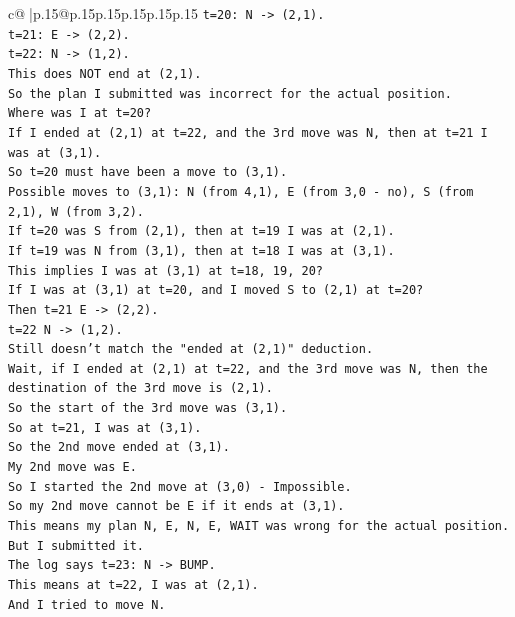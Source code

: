 \documentclass{article}
\begin{document}
{\begin{supertabular}{c@{$\;$}|p{.15\linewidth}@{}p{.15\linewidth}p{.15\linewidth}p{.15\linewidth}p{.15\linewidth}p{.15\linewidth}}
{{{\texttt{t=20: N {-}> (2,1).} \\
\texttt{t=21: E {-}> (2,2).} \\
\texttt{t=22: N {-}> (1,2).} \\
\texttt{This does NOT end at (2,1).} \\
\texttt{So the plan I submitted was incorrect for the actual position.} \\
\texttt{Where was I at t=20?} \\
\texttt{If I ended at (2,1) at t=22, and the 3rd move was N, then at t=21 I was at (3,1).} \\
\texttt{So t=20 must have been a move to (3,1).} \\
\texttt{Possible moves to (3,1): N (from 4,1), E (from 3,0 {-} no), S (from 2,1), W (from 3,2).} \\
\texttt{If t=20 was S from (2,1), then at t=19 I was at (2,1).} \\
\texttt{If t=19 was N from (3,1), then at t=18 I was at (3,1).} \\
\texttt{This implies I was at (3,1) at t=18, 19, 20?} \\
\texttt{If I was at (3,1) at t=20, and I moved S to (2,1) at t=20?} \\
\texttt{Then t=21 E {-}> (2,2).} \\
\texttt{t=22 N {-}> (1,2).} \\
\texttt{Still doesn't match the "ended at (2,1)" deduction.} \\
\texttt{Wait, if I ended at (2,1) at t=22, and the 3rd move was N, then the destination of the 3rd move is (2,1).} \\
\texttt{So the start of the 3rd move was (3,1).} \\
\texttt{So at t=21, I was at (3,1).} \\
\texttt{So the 2nd move ended at (3,1).} \\
\texttt{My 2nd move was E.} \\
\texttt{So I started the 2nd move at (3,0) {-} Impossible.} \\
\texttt{So my 2nd move cannot be E if it ends at (3,1).} \\
\texttt{This means my plan N, E, N, E, WAIT was wrong for the actual position.} \\
\texttt{But I submitted it.} \\
\texttt{The log says t=23: N {-}> BUMP.} \\
\texttt{This means at t=22, I was at (2,1).} \\
\texttt{And I tried to move N.} \\
}}}
\end{supertabular}}
\end{document}
